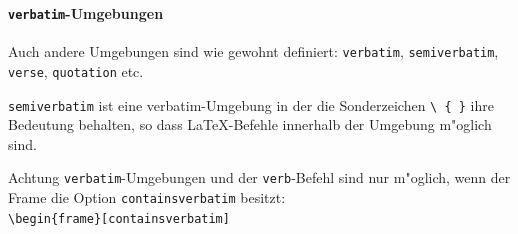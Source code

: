 \documentclass[t]{beamer}
\begin{document}
\begin{frame}[containsverbatim]
  \frametitle{\insertsection}
  \framesubtitle{\texttt{verbatim}-Umgebungen}
  Auch andere Umgebungen sind wie gewohnt definiert:
  \texttt{verbatim}, \texttt{semiverbatim}, \texttt{verse},
  \texttt{quotation} etc.
  \bvskip

  \texttt{semiverbatim} ist eine verbatim-Umgebung in der die
  Sonderzeichen \verb+\ { }+ ihre Bedeutung behalten, so dass
  LaTeX-Befehle innerhalb der Umgebung m"oglich sind.

  \begin{block}{Achtung}
    \texttt{verbatim}-Umgebungen und der \texttt{verb}-Befehl sind nur
    m"oglich, wenn der Frame die Option \texttt{containsverbatim} besitzt:\\
    \verb+\begin{frame}[containsverbatim]+
  \end{block}
\end{frame}

\end{document}
